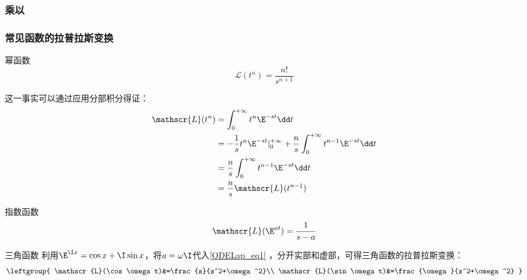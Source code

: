 \subsubsection{乘以}








\subsubsection{常见函数的拉普拉斯变换}

\begin{example}{幂函数}
\begin{equation}
\mathscr{L}(t^n)=\frac{n!}{s^{n+1}}
\end{equation}

这一事实可以通过应用分部积分得证：
\begin{equation}
\begin{aligned}
\mathscr{L}(t^n)&=\int_0^{+\infty}t^n\E^{-st}\dd t\\
&=-\frac{1}{s}t^n\E^{-st}|^{+\infty}_0+\frac{n}{s}\int_0^{+\infty}t^{n-1}\E^{-st}\dd t\\
&=\frac{n}{s}\int_0^{+\infty}t^{n-1}\E^{-st}\dd t\\
&=\frac{n}{s}\mathscr{L}(t^{n-1})
\end{aligned}
\end{equation}
\end{example}

\begin{example}{指数函数}
\begin{equation}\label{ODELap_eq1}
\mathscr{L}(\E^{at})=\frac{1}{s-a}
\end{equation}

\end{example}

\begin{example}{三角函数}
利用$\E^{\I x}=\cos x+\I\sin x$，将$a=\omega\I$代入\autoref{ODELap_eq1} ，分开实部和虚部，可得三角函数的拉普拉斯变换：
\begin{equation}
\leftgroup{
    \mathscr{L}(\cos \omega t)&=\frac{s}{s^2+\omega^2}\\
    \mathscr{L}(\sin \omega t)&=\frac{\omega}{s^2+\omega^2}
}
\end{equation}
\end{example}

















